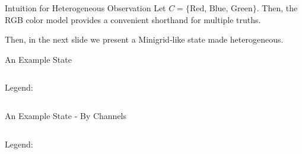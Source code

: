 \begin{frame}{Intuition for Heterogeneous Observation}
    Let \(C = \{\text{Red, Blue, Green}\}\).
    Then, the RGB color model 
    provides a convenient shorthand for multiple truths. \\
   \begin{figure}
        \centering
        
    \end{figure}
    Then, in the next slide we present a Minigrid-like state made heterogeneous.
\end{frame}

\begin{frame}{An Example State}
    \begin{columns}
        \begin{column}{0.4\linewidth}
            Legend:
            \begin{figure}
                \resizebox{!}{0.5\linewidth}{%
                    
                }
            \end{figure}
        \end{column}
        \begin{column}{0.6\linewidth}
            \begin{figure}
                \resizebox{\linewidth}{!}{%
                    
                }
            \end{figure}
        \end{column}
    \end{columns}
\end{frame}

\begin{frame}{An Example State - By Channels}
    \begin{columns}
        \begin{column}{0.4\linewidth}
            Legend:
            \begin{figure}
                \resizebox{!}{0.5\linewidth}{%
                
                }
            \end{figure}
        \end{column}
        \begin{column}{0.6\linewidth}
            \centering
            \begin{figure}
                \resizebox{!}{0.75\linewidth}{%
                    
                }
            \end{figure}
        \end{column}
    \end{columns}
\end{frame}

